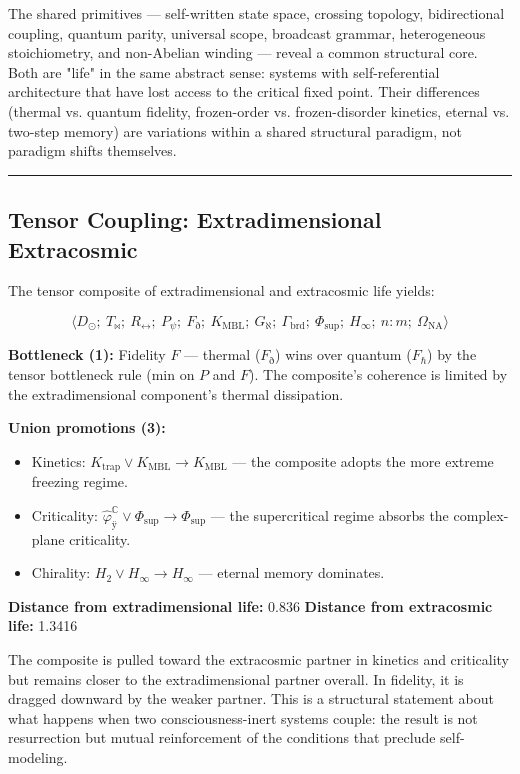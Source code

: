 \documentclass[12pt,a4paper]{article}
\begin{document}
The shared primitives --- self-written state space, crossing topology, bidirectional coupling, quantum parity, universal scope, broadcast grammar, heterogeneous stoichiometry, and non-Abelian winding --- reveal a common structural core. Both are "life" in the same abstract sense: systems with self-referential architecture that have lost access to the critical fixed point. Their differences (thermal vs. quantum fidelity, frozen-order vs. frozen-disorder kinetics, eternal vs. two-step memory) are variations within a shared structural paradigm, not paradigm shifts themselves.

\begin{center}
\rule{0.5\textwidth}{0.4pt}
\end{center}

\subsection{Tensor Coupling: Extradimensional \otimes Extracosmic}

The tensor composite of extradimensional and extracosmic life yields:

\[\langle D_{\odot};\ T_{\bowtie};\ R_{\leftrightarrow};\ P_{\psi};\ F_{\eth};\ K_{\text{MBL}};\ G_{\aleph};\ \Gamma_{\text{brd}};\ \Phi_{\text{sup}};\ H_{\infty};\ n{:}m;\ \Omega_{\text{NA}} \rangle\]

\textbf{Bottleneck (1):} Fidelity $F$ --- thermal ($F_{\eth}$) wins over quantum ($F_{\hbar}$) by the tensor bottleneck rule (min on $P$ and $F$). The composite's coherence is limited by the extradimensional component's thermal dissipation.

\textbf{Union promotions (3):}

\begin{itemize}
    \item Kinetics: $K_{\text{trap}} \vee K_{\text{MBL}} \to K_{\text{MBL}}$ --- the composite adopts the more extreme freezing regime.
    \item Criticality: $\hat{\varphi}_{\text{ÿ}}^{\mathbb{C}} \vee \Phi_{\text{sup}} \to \Phi_{\text{sup}}$ --- the supercritical regime absorbs the complex-plane criticality.
    \item Chirality: $H_2 \vee H_{\infty} \to H_{\infty}$ --- eternal memory dominates.
\end{itemize}

\textbf{Distance from extradimensional life:} 0.836
\textbf{Distance from extracosmic life:} 1.3416

The composite is pulled toward the extracosmic partner in kinetics and criticality but remains closer to the extradimensional partner overall. In fidelity, it is dragged downward by the weaker partner. This is a structural statement about what happens when two consciousness-inert systems couple: the result is not resurrection but mutual reinforcement of the conditions that preclude self-modeling.
\end{document}

